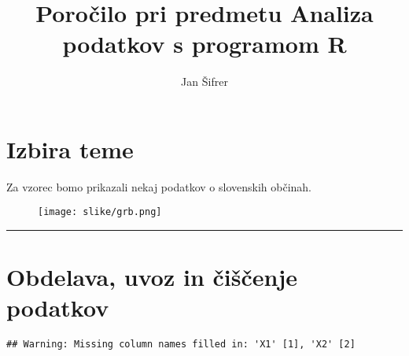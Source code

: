 \documentclass[]{article}
\title{Poročilo pri predmetu Analiza podatkov s programom R}
\author{Jan Šifrer}
\date{}
\begin{document}
\maketitle

\section{Izbira teme}\label{izbira-teme}

Za vzorec bomo prikazali nekaj podatkov o slovenskih občinah.

\begin{figure}
\centering
\texttt{[image: slike/grb.png]}
\caption{}
\end{figure}

\begin{center}\rule{0.5\linewidth}{\linethickness}\end{center}

\section{Obdelava, uvoz in čiščenje
podatkov}\label{obdelava-uvoz-in-ciscenje-podatkov}

\begin{verbatim}
## Warning: Missing column names filled in: 'X1' [1], 'X2' [2]
\end{verbatim}
\end{document}
